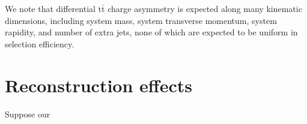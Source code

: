 \documentclass[letterpaper,11pt]{article}
\begin{document}
We note that differential $\mathrm{t\bar{t}}$ charge asymmetry is
expected along many kinematic dimensions, including system mass,
system transverse momentum, system rapidity, and number of extra jets,
none of which are expected to be uniform in selection efficiency.

\section{Reconstruction effects}

Suppose our 
\end{document}
